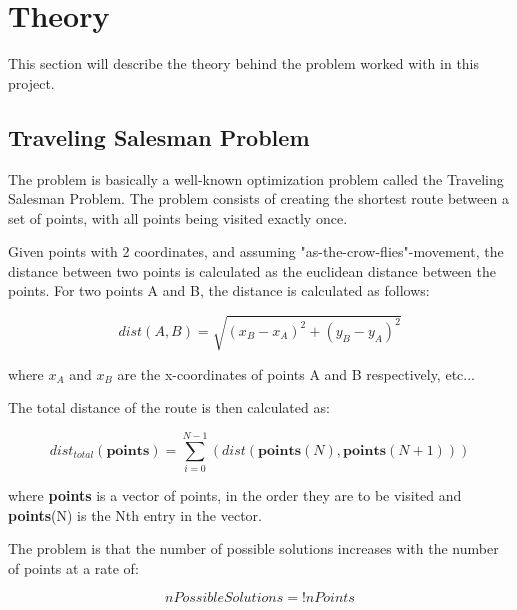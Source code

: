 
\chapter{Theory}
This section will describe the theory behind the problem worked with in this project.

\section{Traveling Salesman Problem}
The problem is basically a well-known optimization problem called the Traveling Salesman Problem\cite{wiki:TSP}. The problem consists of creating the shortest route between a set of points, with all points being visited exactly once. 

Given points with 2 coordinates, and assuming "as-the-crow-flies"-movement, the distance between two points is calculated as the euclidean distance between the points. For two points A and B, the distance is calculated as follows:

\begin{equation}
	dist(A,B) = \sqrt{(x_B - x_A)^2 + (y_B - y_A)^2}
\end{equation}

where $x_A$ and $x_B$ are the x-coordinates of points A and B respectively, etc...

The total distance of the route is then calculated as:

\begin{equation}
	dist_{total}(\textbf{points}) = \sum_{i=0}^{N-1}(dist(\textbf{points}(N),\textbf{points}(N+1)))
\end{equation}

where \textbf{points} is a vector of points, in the order they are to be visited and \textbf{points}(N) is the Nth entry in the vector.

The problem is that the number of possible solutions increases with the number of points at a rate of:

\begin{equation}
	nPossibleSolutions=!nPoints
\end{equation}

\label{eq:number_of_possible_solutions}

